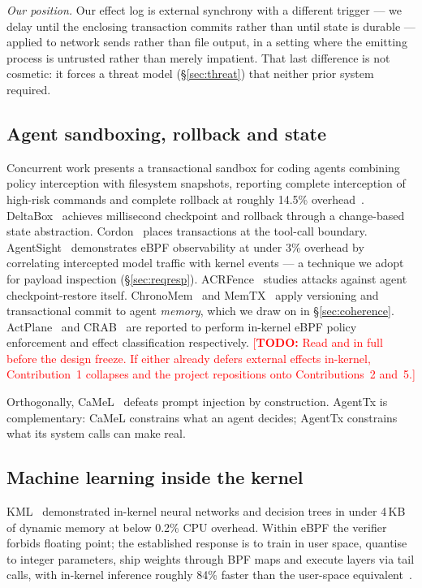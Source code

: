 \documentclass[10pt,twocolumn]{article}
\newcommand{\sys}{AgentTx}
\newcommand{\todo}[1]{\textcolor{red}{[\textbf{TODO:} #1]}}
\begin{document}
\emph{Our position.} Our effect log is external synchrony with a different
trigger --- we delay until the enclosing transaction commits rather than until
state is durable --- applied to network sends rather than file output, in a
setting where the emitting process is untrusted rather than merely impatient.
That last difference is not cosmetic: it forces a threat model
(\S\ref{sec:threat}) that neither prior system required.

\subsection{Agent sandboxing, rollback and state}

Concurrent work presents a transactional sandbox for coding agents combining
policy interception with filesystem snapshots, reporting complete interception
of high-risk commands and complete rollback at roughly 14.5\%
overhead~\cite{ftsandbox2025}. DeltaBox~\cite{deltabox2026} achieves millisecond
checkpoint and rollback through a change-based state abstraction.
Cordon~\cite{cordon2026} places transactions at the tool-call boundary.
AgentSight~\cite{agentsight2025} demonstrates eBPF observability at under 3\%
overhead by correlating intercepted model traffic with kernel events --- a
technique we adopt for payload inspection (\S\ref{sec:reqresp}).
ACRFence~\cite{acrfence2026} studies attacks against agent checkpoint-restore
itself. ChronoMem~\cite{chronomem2026} and MemTX~\cite{memtx2026} apply
versioning and transactional commit to agent \emph{memory}, which we draw on in
\S\ref{sec:coherence}. ActPlane~\cite{actplane} and CRAB~\cite{crab} are
reported to perform in-kernel eBPF policy enforcement and effect classification
respectively.
\todo{Read \cite{actplane} and \cite{crab} in full before the design freeze. If
either already defers external effects in-kernel, Contribution~1 collapses and
the project repositions onto Contributions~2 and~5.}

Orthogonally, CaMeL~\cite{debenedetti2025camel} defeats prompt injection by
construction. \sys{} is complementary: CaMeL constrains what an agent decides;
\sys{} constrains what its system calls can make real.

\subsection{Machine learning inside the kernel}

KML~\cite{akgun2023kml,akgun2021kmlarxiv} demonstrated in-kernel neural networks
and decision trees in under 4\,KB of dynamic memory at below 0.2\% CPU overhead.
Within eBPF the verifier forbids floating point; the established response is to
train in user space, quantise to integer parameters, ship weights through BPF
maps and execute layers via tail calls, with in-kernel inference roughly 84\%
faster than the user-space
equivalent~\cite{ebpffixedpoint2024,kernelpacketml2024,ebpfml2024}.
\end{document}
